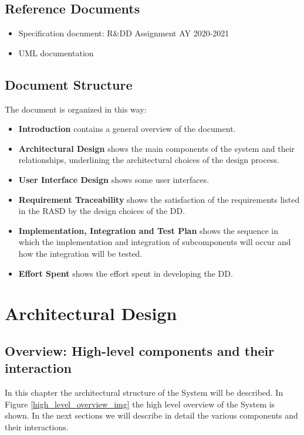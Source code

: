 \documentclass[a4paper, 12pt, oneside, table]{article}
\begin{document}
\subsection{Reference Documents}
\begin{itemize}
    \item Specification document: R\&DD Assignment AY 2020-2021
    \item UML documentation 
\end{itemize}

\subsection{Document Structure}
The document is organized in this way:
\begin{itemize}
    \item \textbf{Introduction} contains a general overview of the document.
    \item \textbf{Architectural Design} shows the main components of the system and their relationships, underlining the  architectural choices of the design process.
    \item \textbf{User Interface Design} shows some user interfaces.
    \item \textbf{Requirement Traceability} shows the satisfaction of the requirements listed in the RASD by the design choices of the DD.
    \item \textbf{Implementation, Integration and Test Plan} shows the sequence in which the implementation and integration of subcomponents will occur and how the integration will be tested.
    \item \textbf{Effort Spent} shows the effort spent in developing the DD.
\end{itemize}

\newpage
\section{Architectural Design}
\subsection{Overview: High-level components and their interaction}
In this chapter the architectural structure of the System will be described. In Figure \ref{high_level_overview_img} the high level overview of the System is shown. In the next sections we will describe in detail the various components and their interactions.
\end{document}
